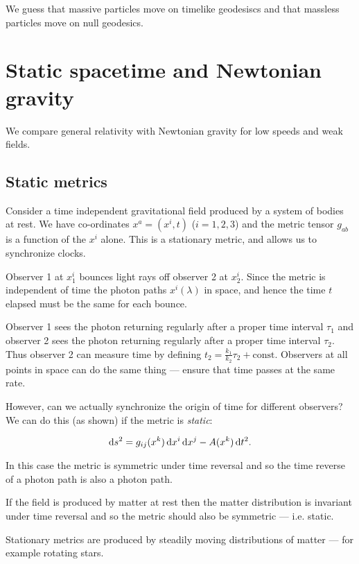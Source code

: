 \documentclass{notes}
\begin{document}
We guess that massive particles move on timelike geodesiscs and
that massless particles move on null geodesics.

\section{Static spacetime and Newtonian gravity}

We compare general relativity with Newtonian gravity for low
speeds and weak fields.

\subsection{Static metrics}

Consider a time independent gravitational field produced
by a system of bodies at rest.  We have co-ordinates
$x^a = (x^i,t)$ ($i =1,2,3$) and the metric tensor
$g_{a b}$ is a function of the $x^i$ alone.  This is a stationary metric,
and allows us to synchronize clocks.

\begin{flushright}
\parbox{3in}{
Observer 1 at $x_1^i$ bounces light rays off observer 2 at $x_2^i$.
Since the metric is independent of time the photon paths
$x^i(\lambda)$ in space, and hence the
time $t$ elapsed must be the same for each bounce.

Observer 1 sees the photon returning regularly after a proper time
interval $\tau_1$ and observer 2 sees the photon returning regularly
after a proper time interval $\tau_2$.  Thus observer 2 can measure
time by defining $t_2 = \tfrac{k_1}{k_2} \tau_2 + \text{const}$.
Observers at all points in space can do the same thing --- ensure that
time passes at the same rate.
}
\end{flushright}

However, can we actually synchronize the origin of time for different
observers?  We can do this (as shown) if the metric is \emph{static}:

\[
\mathrm{d} s^2 = g_{ij}(x^k)\, \mathrm{d} x^i\, \mathrm{d} x^j - A(x^k)\, \mathrm{d} t^2.
\]

In this case the metric is symmetric under time reversal and so the
time reverse of a photon path is also a photon path.

If the field is produced by matter at rest then the matter distribution
is invariant under time reversal and so the metric should also be symmetric
--- i.e. static.

Stationary metrics are produced by steadily moving distributions of
matter --- for example rotating stars.
\end{document}
